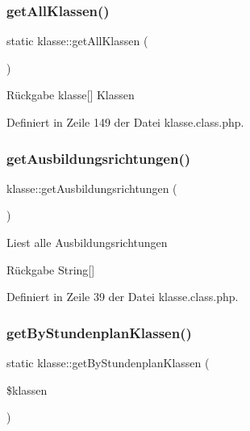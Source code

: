 \subsubsection{\texorpdfstring{get\+All\+Klassen()}{getAllKlassen()}}
{\footnotesize\ttfamily static klasse\+::get\+All\+Klassen (\begin{DoxyParamCaption}{ }\end{DoxyParamCaption})\hspace{0.3cm}{\ttfamily [static]}}

\begin{DoxyReturn}{Rückgabe}
klasse\mbox{[}\mbox{]} Klassen 
\end{DoxyReturn}


Definiert in Zeile 149 der Datei klasse.\+class.\+php.

\mbox{\label{classklasse_ad27975ea62d4436f903e75b59aab9b9b}} 
\subsubsection{\texorpdfstring{get\+Ausbildungsrichtungen()}{getAusbildungsrichtungen()}}
{\footnotesize\ttfamily klasse\+::get\+Ausbildungsrichtungen (\begin{DoxyParamCaption}{ }\end{DoxyParamCaption})}

Liest alle Ausbildungsrichtungen \begin{DoxyReturn}{Rückgabe}
String\mbox{[}\mbox{]} 
\end{DoxyReturn}


Definiert in Zeile 39 der Datei klasse.\+class.\+php.

\mbox{\label{classklasse_ab1709bd110448189804340c2b873a825}} 
\subsubsection{\texorpdfstring{get\+By\+Stundenplan\+Klassen()}{getByStundenplanKlassen()}}
{\footnotesize\ttfamily static klasse\+::get\+By\+Stundenplan\+Klassen (\begin{DoxyParamCaption}\item[{}]{\$klassen }\end{DoxyParamCaption})\hspace{0.3cm}{\ttfamily [static]}}


